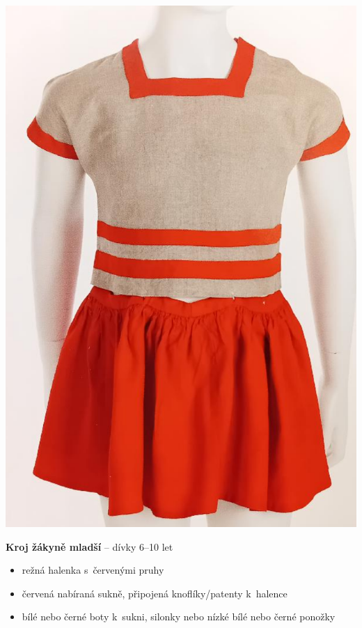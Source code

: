 \documentclass[11pt]{article}
\begin{document}
\begin{minipage}{0.3\linewidth}   
  \includegraphics[width=0.98\linewidth]{kroj_zakyne.png} 
\end{minipage}
\begin{minipage}{0.6\linewidth}
  \center
  \textbf{Kroj žákyně mladší} – dívky 6–10 let

  \begin{itemize}[itemsep=-3pt,leftmargin=2em]
    \item režná halenka s~červenými pruhy
    \item červená nabíraná sukně, připojená knoflíky/patenty k~halence
    \item bílé nebo černé \luv{}boty k~sukni\ruv{}, silonky nebo nízké bílé nebo černé ponožky
  \end{itemize}
\end{minipage}
\end{document}
